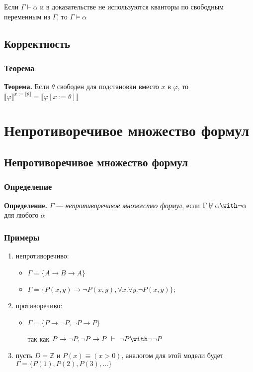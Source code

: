 \documentclass[10pt,a4paper,oneside]{article}
\begin{document}
 Если $\Gamma\vdash\alpha$ и в доказательстве не используются кванторы по свободным
переменным из $\Gamma$, то $\Gamma\models\alpha$

\subsection{Корректность}
\subsubsection{Теорема}
{\bf Теорема.} Если $\theta$ свободен для подстановки 
вместо $x$ в $\varphi$, то $\llbracket\varphi\rrbracket^{x := \llbracket\theta\rrbracket} = \llbracket\varphi[x := \theta]\rrbracket$

\section{Непротиворечивое множество формул}
\subsection{Непротиворечивое множество формул}
\subsubsection{Определение}
{\bf Определение.} $\Gamma$ --- \emph{непротиворечивое множество формул},
если $\Gamma\not\vdash\alpha\with\neg\alpha$ для любого $\alpha$

\subsubsection{Примеры}
\begin{enumerate}
\item непротиворечиво: \begin{itemize}
\item $\Gamma = \{A \rightarrow B \rightarrow A\}$
\item $\Gamma = \{P(x,y)\rightarrow\neg P(x,y), \forall x.\forall y.\neg P(x,y)\}$;
\end{itemize}
\item противоречиво: \begin{itemize}
\item $\Gamma = \{P\rightarrow\neg P, \neg P \rightarrow P\}$

так как
$P\rightarrow\neg P, \neg P \rightarrow P \ \vdash\  \neg P \with \neg\neg P$
\end{itemize}
\item пусть $D = \mathbb{Z}$ и $P(x) \equiv (x > 0)$, аналогом для этой модели
будет $\Gamma = \{P(1), P(2), P(3), \dots\}$
\end{enumerate}
\end{document}

